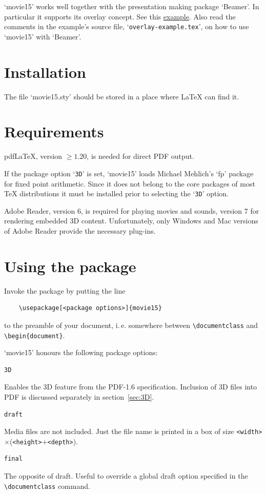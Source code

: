 \documentclass[a4paper]{article}
\begin{document}
`movie15' works well together with the presentation making package `Beamer'. In particular it supports its overlay concept. See this \href{./overlay-example.pdf}{example}.
Also read the comments in the example's source file, `\verb+overlay-example.tex+', on how to use `movie15' with `Beamer'.

\section{Installation}
The file `movie15.sty' should be stored in a place where \LaTeX{} can find it.

\section{Requirements}
pdf\LaTeX{}, version $\ge1.20$, is needed for direct PDF output.

If the package option `\verb+3D+' is set, `movie15' loads Michael Mehlich's `fp' package for fixed point arithmetic. Since it does not belong to the core packages of most \TeX{} distributions it must be installed prior to selecting the `\verb+3D+' option.

Adobe Reader, version 6, is required for playing movies and sounds, version 7 for rendering embedded 3D content. Unfortunately, only Windows and Mac versions of Adobe Reader provide the necessary plug-ins.

\newpage
\section{Using the package}
Invoke the package by putting the line
\begin{verbatim}
    \usepackage[<package options>]{movie15}
\end{verbatim}
to the preamble of your document, i.\,e. somewhere between \verb+\documentclass+ and \verb+\begin{document}+.

`movie15' honours the following package options:
\begin{verbatim}
3D
\end{verbatim}
Enables the 3D feature from the PDF-1.6 specification. Inclusion of 3D files into PDF is discussed separately in section~\ref{sec:3D}.

\begin{verbatim}
draft
\end{verbatim}
Media files are not included. Just the file name is printed in a box of size \verb+<width>+$\times$(\verb+<height>++\verb+<depth>+).
\begin{verbatim}
final
\end{verbatim}
The opposite of draft. Useful to override a global draft option specified
in the \verb+\documentclass+ command.
\end{document}

